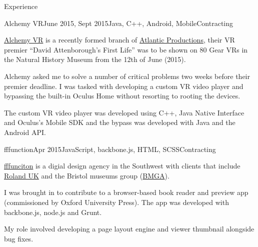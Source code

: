 \documentclass{resume} %
\begin{document}
\begin{rSection}{Experience}
\begin{rSubsection}{Alchemy VR}{June 2015, Sept 2015}{Java, C++, Android, Mobile}{Contracting}
\item \href{http://www.alchemyvr.com/}{Alchemy VR} is a recently formed branch of \href{http://www.atlanticproductions.tv/}{Atlantic Productions}, their VR premier ``David Attenborough's First Life'' was to be shown on 80 Gear VRs in the Natural History Museum from the 12th of June (2015).
\item Alchemy asked me to solve a number of critical problems two weeks before their premier deadline. I was tasked with developing a custom VR video player and bypassing the built-in Oculus Home without resorting to rooting the devices.
\item The custom VR video player was developed using C++, Java Native Interface and Oculus's Mobile SDK and the bypass was developed with Java and the Android API.
\end{rSubsection}


\begin{rSubsection}{fffunction}{Apr 2015}{JavaScript, backbone.js, HTML, SCSS}{Contracting}
\item \href{http://fffunction.co/}{fffunciton} is a digial design agency in the Southwest with clients that include \href{http://www.roland.co.uk}{Roland UK} and the Bristol museums group (\href{http://bristolmuseums.org.uk}{BMGA}).
\item I was brought in to contribute to a browser-based book reader and preview app (commissioned by Oxford University Press). The app was developed with backbone.js, node.js and Grunt. 
\item My role involved developing a page layout engine and viewer thumbnail alongside bug fixes.
\end{rSubsection}



\end{rSection}
\end{document}
